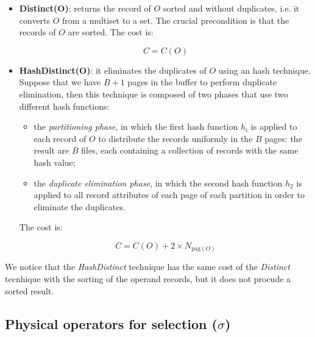 \begin{itemize}
    \item \textbf{Distinct(O)}: returns the record of $O$ sorted and without duplicates, i.e. it converts $O$ from a multiset to a set. The crucial precondition is that the records of $O$ are sorted. The cost is:

    $$
    C = C(O)
    $$

    \item \textbf{HashDistinct(O)}: it eliminates the duplicates of $O$ using an hash technique. Suppose that we have $B + 1$ pages in the buffer to perform duplicate elimination, then this technique is composed of two phases that use two different hash functions:
    
    \begin{itemize}
        \item the \textit{partitioning phase}, in which the first hash function $h_i$ is applied to each record of $O$ to distribute the records uniformly in the $B$ pages: the result are $B$ files, each containing a collection of records with the same hash value;
        \item the \textit{duplicate elimination phase}, in which the second hash function $h_2$ is applied to all record attributes of each page of each partition in order to eliminate the duplicates.
    \end{itemize}

    The cost is:

    $$
    C = C(O) + 2 \times N_{\text{pag}(O)}
    $$
    
\end{itemize}

We notice that the \textit{HashDistinct} technique has the same cost of the \textit{Distinct} tecnhique with the sorting of the operand records, but it does not procude a sorted result.

\subsection{Physical operators for selection ($\sigma$)}

